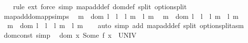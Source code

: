\begin{isabellebody}
%
\isadelimproof
\ \ %
\endisadelimproof
%
\isatagproof
{}\isamarkupfalse%
\ {\isacharparenleft}{\kern0pt}rule\ ext{\isacharparenright}{\kern0pt}\ {\isacharparenleft}{\kern0pt}force\ simp{\isacharcolon}{\kern0pt}\ map{\isacharunderscore}{\kern0pt}add{\isacharunderscore}{\kern0pt}def\ dom{\isacharunderscore}{\kern0pt}def\ split{\isacharcolon}{\kern0pt}\ option{\isachardot}{\kern0pt}split{\isacharparenright}{\kern0pt}%
\endisatagproof
{\isafoldproof}%
%
\isadelimproof
\isanewline
%
\endisadelimproof
\isanewline
{}\isamarkupfalse%
\ map{\isacharunderscore}{\kern0pt}add{\isacharunderscore}{\kern0pt}dom{\isacharunderscore}{\kern0pt}app{\isacharunderscore}{\kern0pt}simps{\isacharcolon}{\kern0pt}\isanewline
\ \ {\isachardoublequoteopen}m\ {\isasymin}\ dom\ l{}\ {\isasymLongrightarrow}\ {\isacharparenleft}{\kern0pt}l{}\ {\isacharplus}{\kern0pt}{\isacharplus}{\kern0pt}\ l{}{\isacharparenright}{\kern0pt}\ m\ {\isacharequal}{\kern0pt}\ l{}\ m{\isachardoublequoteclose}\isanewline
\ \ {\isachardoublequoteopen}m\ {\isasymnotin}\ dom\ l{}\ {\isasymLongrightarrow}\ {\isacharparenleft}{\kern0pt}l{}\ {\isacharplus}{\kern0pt}{\isacharplus}{\kern0pt}\ l{}{\isacharparenright}{\kern0pt}\ m\ {\isacharequal}{\kern0pt}\ l{}\ m{\isachardoublequoteclose}\isanewline
\ \ {\isachardoublequoteopen}m\ {\isasymnotin}\ dom\ l{}\ {\isasymLongrightarrow}\ {\isacharparenleft}{\kern0pt}l{}\ {\isacharplus}{\kern0pt}{\isacharplus}{\kern0pt}\ l{}{\isacharparenright}{\kern0pt}\ m\ {\isacharequal}{\kern0pt}\ l{}\ m{\isachardoublequoteclose}\isanewline
%
\isadelimproof
\ \ %
\endisadelimproof
%
\isatagproof
{}\isamarkupfalse%
\ {\isacharparenleft}{\kern0pt}auto\ simp\ add{\isacharcolon}{\kern0pt}\ map{\isacharunderscore}{\kern0pt}add{\isacharunderscore}{\kern0pt}def\ split{\isacharcolon}{\kern0pt}\ option{\isachardot}{\kern0pt}split{\isacharunderscore}{\kern0pt}asm{\isacharparenright}{\kern0pt}%
\endisatagproof
{\isafoldproof}%
%
\isadelimproof
\isanewline
%
\endisadelimproof
\isanewline
{}\isamarkupfalse%
\ dom{\isacharunderscore}{\kern0pt}const\ {\isacharbrackleft}{\kern0pt}simp{\isacharbrackright}{\kern0pt}{\isacharcolon}{\kern0pt}\isanewline
\ \ {\isachardoublequoteopen}dom\ {\isacharparenleft}{\kern0pt}{\isasymlambda}x{\isachardot}{\kern0pt}\ Some\ {\isacharparenleft}{\kern0pt}f\ x{\isacharparenright}{\kern0pt}{\isacharparenright}{\kern0pt}\ {\isacharequal}{\kern0pt}\ UNIV{\isachardoublequoteclose}\isanewline

\end{isabellebody}
